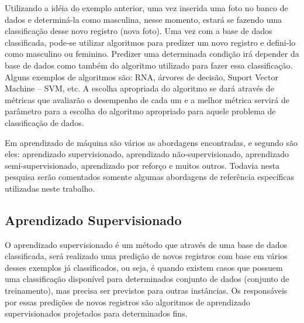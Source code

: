 Utilizando a idéia do exemplo anterior, uma vez inserida uma foto no banco de dados e determiná-la como masculina, nesse momento, estará se fazendo uma classificação desse novo registro (nova foto). Uma vez com a base de dados classificada, pode-se utilizar algoritmos para predizer um novo registro e defini-lo como masculino ou feminino. Predizer uma determinada condição irá depender da base de dados como também do algoritmo utilizado para fazer essa classificação. Alguns  exemplos de algoritmos são:  RNA, árvores de decisão, Suport Vector Machine – SVM, etc. A escolha apropriada do algoritmo se dará através de métricas que avaliarão o desempenho de cada um e a melhor métrica servirá de parâmetro para a escolha do algoritmo apropriado para aquele problema de classificação de dados. 


Em aprendizado de máquina são vários as abordagens encontradas, e segundo  são eles: aprendizado supervisionado, aprendizado não-supervisionado, aprendizado semi-supervisionado, aprendizado por reforço e  muitos outros. Todavia nesta pesquisa serão comentados somente algumas abordagens de referência específicas utilizadas neste trabalho.

\subsection{Aprendizado Supervisionado}\label{cap:refTeor:ssec:aprendSup}

O aprendizado supervisionado é um método que através de uma base de dados classificada, será realizado uma predição de novos registros com base em vários desses exemplos já classificados, ou seja, é quando existem casos que possuem uma classificação disponível para determinados conjunto de dados (conjunto de treinamento), mas precisa ser previstos para outras instâncias. Os responsáveis por essas predições de novos registros são algoritmos de aprendizado supervisionados projetados para determinados fins.


